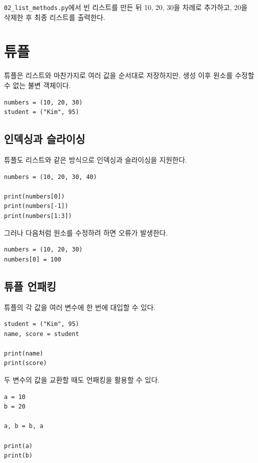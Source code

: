 \documentclass[11pt,a4paper]{article}
\begin{document}
\begin{practicebox}
\texttt{02\_list\_methods.py}에서 빈 리스트를 만든 뒤 10, 20, 30을 차례로 추가하고, 20을 삭제한 후 최종 리스트를 출력한다.
\end{practicebox}

\section{튜플}

튜플은 리스트와 마찬가지로 여러 값을 순서대로 저장하지만, 생성 이후 원소를 수정할 수 없는 불변 객체이다.

\begin{lstlisting}
numbers = (10, 20, 30)
student = ("Kim", 95)
\end{lstlisting}

\subsection{인덱싱과 슬라이싱}

튜플도 리스트와 같은 방식으로 인덱싱과 슬라이싱을 지원한다.

\begin{lstlisting}
numbers = (10, 20, 30, 40)

print(numbers[0])
print(numbers[-1])
print(numbers[1:3])
\end{lstlisting}

그러나 다음처럼 원소를 수정하려 하면 오류가 발생한다.

\begin{lstlisting}
numbers = (10, 20, 30)
numbers[0] = 100
\end{lstlisting}

\subsection{튜플 언패킹}

튜플의 각 값을 여러 변수에 한 번에 대입할 수 있다.

\begin{lstlisting}
student = ("Kim", 95)
name, score = student

print(name)
print(score)
\end{lstlisting}

두 변수의 값을 교환할 때도 언패킹을 활용할 수 있다.

\begin{lstlisting}
a = 10
b = 20

a, b = b, a

print(a)
print(b)
\end{lstlisting}
\end{document}
